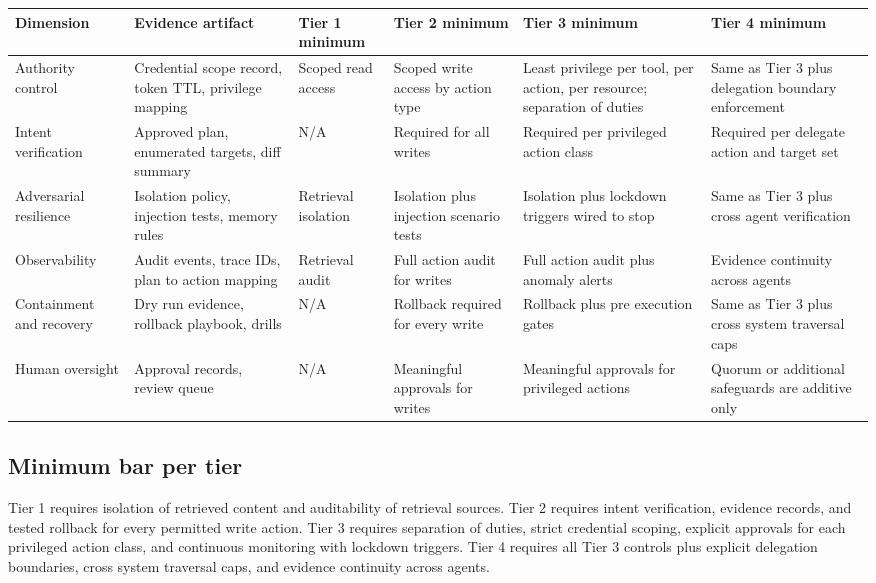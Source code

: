 \documentclass[11pt]{article}
\begin{document}
\begin{longtable}{>{\raggedright\arraybackslash}p{1.0in}>{\raggedright\arraybackslash}p{1.2in}>{\raggedright\arraybackslash}p{0.76in}>{\raggedright\arraybackslash}p{0.76in}>{\raggedright\arraybackslash}p{0.76in}>{\raggedright\arraybackslash}p{0.76in}}
\textbf{Dimension} & \textbf{Evidence artifact} & \textbf{Tier 1 minimum} & \textbf{Tier 2 minimum} & \textbf{Tier 3 minimum} & \textbf{Tier 4 minimum} \\
\hline
\endhead
Authority control & Credential scope record, token TTL, privilege mapping & Scoped read access & Scoped write access by action type & Least privilege per tool, per action, per resource; separation of duties & Same as Tier 3 plus delegation boundary enforcement \\
\hline
Intent verification & Approved plan, enumerated targets, diff summary & N/A & Required for all writes & Required per privileged action class & Required per delegate action and target set \\
\hline
Adversarial resilience & Isolation policy, injection tests, memory rules & Retrieval isolation & Isolation plus injection scenario tests & Isolation plus lockdown triggers wired to stop & Same as Tier 3 plus cross agent verification \\
\hline
Observability & Audit events, trace IDs, plan to action mapping & Retrieval audit & Full action audit for writes & Full action audit plus anomaly alerts & Evidence continuity across agents \\
\hline
Containment and recovery & Dry run evidence, rollback playbook, drills & N/A & Rollback required for every write & Rollback plus pre execution gates & Same as Tier 3 plus cross system traversal caps \\
\hline
Human oversight & Approval records, review queue & N/A & Meaningful approvals for writes & Meaningful approvals for privileged actions & Quorum or additional safeguards are additive only \\
\hline
\end{longtable}

\subsection{Minimum bar per tier}
Tier 1 requires isolation of retrieved content and auditability of retrieval sources. Tier 2 requires intent verification, evidence records, and tested rollback for every permitted write action. Tier 3 requires separation of duties, strict credential scoping, explicit approvals for each privileged action class, and continuous monitoring with lockdown triggers. Tier 4 requires all Tier 3 controls plus explicit delegation boundaries, cross system traversal caps, and evidence continuity across agents.
\end{document}
